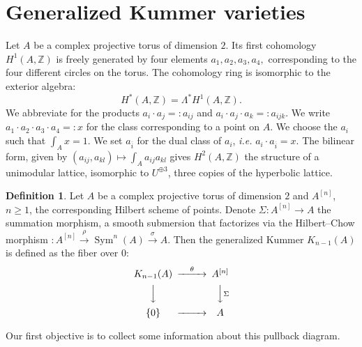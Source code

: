 \documentclass{amsart}
\DeclareMathOperator{\Sym}{Sym}
\newcommand{\hilb}[1]{^{[#1]}}
\newcommand{\ie}{{\it i.e. }}
\newcommand{\kum}[2]{K_{ #2 }( #1 )}
\newcommand{\Z}{\mathbb{Z}}
\theoremstyle{plain}
\theoremstyle{definition}
\newtheorem{definition}[theorem]{Definition}
\theoremstyle{remark}
\begin{document}
\section{Generalized Kummer varieties}
Let $A$ be a complex projective torus of dimension $2$. Its first cohomology $H^1(A,\Z)$ is freely generated by four elements $a_1,a_2,a_3,a_4,$ corresponding to the four different circles on the torus. The cohomology ring is isomorphic to the exterior algebra:
$$
H^*(A,\Z) = \Lambda^* H^1(A,\Z).
$$
We abbreviate for the products $a_i\cdot a_j =: a_{ij}$ and $a_i\cdot a_j\cdot a_k =: a_{ijk}$. We write $a_1\cdot a_2\cdot a_3 \cdot a_4 =:x$ for the class corresponding to a point on $A$. We choose the $a_i$ such that $\int_A x = 1$. We set $a_{\overline{i}}$ for the dual class of $a_i$, \ie  $a_i\cdot a_{\overline{i}} =x$.
The bilinear form, given by $(a_{ij},a_{kl})\mapsto\int_A a_{ij}a_{kl}$ gives $H^2(A,\Z)$ the structure of a unimodular lattice, isomorphic to $U^{\oplus 3}$, three copies of the hyperbolic lattice. 

\begin{definition}
Let $A$ be a complex projective torus of dimension $2$ and $A\hilb{n}$, $n\geq 1$, the corresponding Hilbert scheme of points. Denote $\Sigma : A\hilb{n} \rightarrow A$ the summation morphism, a smooth submersion that factorizes via the Hilbert--Chow morphism $: A\hilb{n}\stackrel{\rho}{\rightarrow}\Sym^n(A)\stackrel{\sigma}{\rightarrow} A$. Then the generalized Kummer $\kum{A}{n-1}$ is defined as the fiber over $0$:
\begin{equation}\label{square}
\begin{CD}
\kum{A}{n-1} @>\theta >> A\hilb{n}\\
@VVV @VV\Sigma V\\
\{0\} @> >> A
\end{CD}
\end{equation}
\end{definition}
Our first objective is to collect some information about this pullback diagram. 
\end{document}

